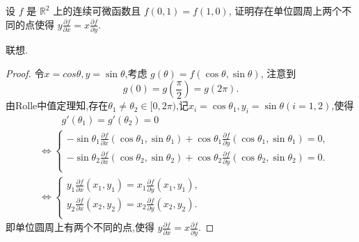 \documentclass[../../main.tex]{subfiles}%
\begin{document}
\begin{example}
设 \( f \) 是 \( \mathbb{R}^2 \) 上的连续可微函数且 \( f(0, 1) = f(1, 0) \), 证明存在单位圆周上两个不同的点使得 \( y \frac{\partial f}{\partial x} = x \frac{\partial f}{\partial y} \).
\end{example}
\begin{note}
联想.
\end{note}
\begin{proof}

令$x=cos\theta ,y=\sin\theta $,考虑 \( g(\theta) = f(\cos \theta, \sin \theta) \), 注意到
\[
g(0) = g\left( \frac{\pi}{2} \right) = g(2\pi).
\]
由Rolle中值定理知,存在$\theta_1\ne \theta_2 \in [0,2\pi)$,记$x_i=\cos\theta_1,y_i=\sin\theta(i=1,2)$,使得
\begin{align*}
&\quad \quad \,\,g' \left( \theta _1 \right) =g' \left( \theta _2 \right) =0
\\
&\Longleftrightarrow \begin{cases}
-\sin \theta _1\frac{\partial f}{\partial x}\left( \cos \theta _1,\sin \theta _1 \right) +\cos \theta _1\frac{\partial f}{\partial y}\left( \cos \theta _1,\sin \theta _1 \right) =0,\\
-\sin \theta _2\frac{\partial f}{\partial x}\left( \cos \theta _2,\sin \theta _2 \right) +\cos \theta _2\frac{\partial f}{\partial y}\left( \cos \theta _2,\sin \theta _2 \right) =0.\\
\end{cases}
\\
&\Longleftrightarrow \begin{cases}
y_1\frac{\partial f}{\partial x}\left( x_1,y_1 \right) =x_1\frac{\partial f}{\partial y}\left( x_1,y_1 \right) ,\\
y_2\frac{\partial f}{\partial x}\left( x_2,y_2 \right) =x_2\frac{\partial f}{\partial y}\left( x_2,y_2 \right).\\
\end{cases}
\end{align*}
即单位圆周上有两个不同的点,使得 \( y \frac{\partial f}{\partial x} = x \frac{\partial f}{\partial y} \).

\end{proof}
\end{document}
